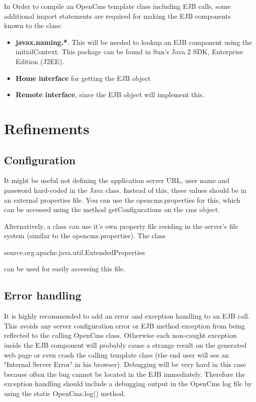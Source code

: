 In Order to compile an OpenCms template class including EJB calls, some
additional import statements are required for making the EJB components
known to the class:

\begin{itemize}
\item {\bf javax.naming.*}. This will be needed to lookup an EJB component
using the initialContext. This package can be found in Sun's Java
2 SDK, Enterprise Edition (J2EE).
\item {\bf Home interface} for getting the EJB object
\item {\bf Remote interface}, since the EJB object will implement this.
\end{itemize}

\section{Refinements}
\subsection{Configuration}
It might be useful not defining the application server URL, user name
and password hard-coded in the Java class. Instead of this, these values
should be in an external properties file. You can use the
opencms.properties for this, which can be accessed using the method
{\meth getConfigurations} on the cms object.

Alternatively, a class can use it's own property file residing in the
server's file system (similar to the opencms.properties). The class

{\code source.org.apache.java.util.ExtendedProperties}

can be used for easily accessing this file.

\subsection{Error handling}
It is highly recommended to add an error and exception handling to an
EJB call. This avoids any server configuration error or EJB method
exception from being reflected to the calling OpenCms class. Otherwise
each non-caught exception inside the EJB component will probably cause a
strange result on the generated web page or even crash the calling
template class (the end user will see an "Internal Server Error" in his
browser).
Debugging will be very hard in this case because often the bug cannot be
located in the EJB immediately. Therefore the exception handling should
include a debugging output in the OpenCms log file by using the static
OpenCms.log() method.

